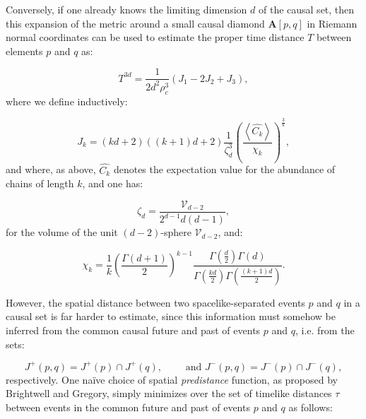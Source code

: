 \documentclass{article}
\begin{document}
Conversely, if one already knows the limiting dimension $d$ of the causal set, then this expansion of the metric around a small causal diamond ${\mathbf{A} \left[ p, q \right]}$ in Riemann normal coordinates can be used to estimate the proper time distance $T$ between elements $p$ and $q$ as:

\begin{equation}
T^{3 d} = \frac{1}{2d^2 \rho_{c}^{3}} \left( J_1 - 2 J_2 + J_3 \right),
\end{equation}
where we define inductively:

\begin{equation}
J_k = \left( kd + 2 \right) \left( \left( k + 1 \right) d + 2 \right) \frac{1}{\zeta_{d}^{3}} \left( \frac{\left\langle \hat{C_k} \right\rangle}{\chi_k} \right)^{\frac{3}{k}},
\end{equation}
and where, as above, ${\hat{C_k}}$ denotes the expectation value for the abundance of chains of length $k$, and one has:

\begin{equation}
\zeta_d = \frac{\mathcal{V}_{d - 2}}{2^{d - 1} d \left( d - 1 \right)},
\end{equation}
for the volume of the unit ${\left( d - 2 \right)}$-sphere ${\mathcal{V}_{d - 2}}$, and:

\begin{equation}
\chi_k = \frac{1}{k} \left( \frac{\Gamma \left( d + 1 \right)}{2} \right)^{k - 1} \frac{\Gamma\left( \frac{d}{2} \right) \Gamma \left( d \right)}{\Gamma \left( \frac{kd}{2} \right) \Gamma \left( \frac{\left( k + 1 \right) d}{2} \right)}.
\end{equation}

However, the spatial distance between two spacelike-separated events $p$ and $q$ in a causal set is far harder to estimate, since this information must somehow be inferred from the common causal future and past of events $p$ and $q$, i.e. from the sets:

\begin{equation}
J^{+} \left( p, q \right) = J^{+} \left( p \right) \cap J^{+} \left( q \right), \qquad \text{ and } J^{-} \left( p, q \right) = J^{-} \left( p \right) \cap J^{-} \left( q \right),
\end{equation}
respectively. One na\"ive choice of spatial \textit{predistance} function, as proposed by Brightwell and Gregory\cite{brightwell}, simply minimizes over the set of timelike distances ${\tau}$ between events in the common future and past of events $p$ and $q$ as follows:
\end{document}

